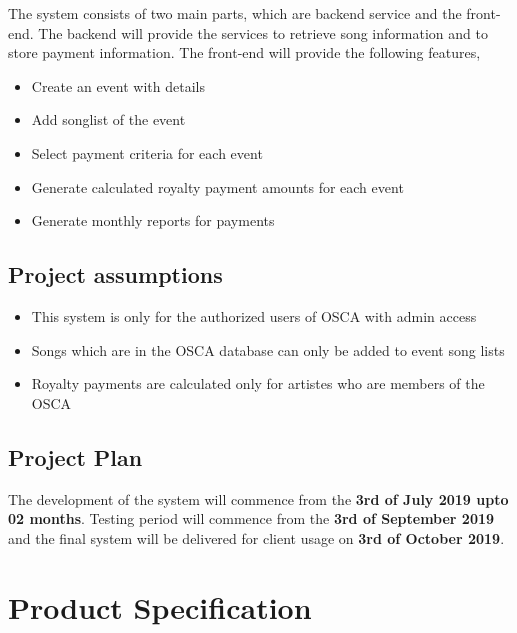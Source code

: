 \documentclass[12pt,a4paper]{article}
\begin{document}
The system consists of two main parts, which are backend service and the front-end. The backend will provide the services to retrieve song information and to store payment information.
The front-end will provide the following features,
\begin{itemize}
    \item Create an event with details
    \item Add songlist of the event
    \item Select payment criteria for each event
    \item Generate calculated royalty payment amounts for each event
    \item Generate monthly reports for payments
\end{itemize}
\vspace{12pt}


\subsection{Project assumptions}
\vspace{12pt}

\begin{itemize}
    \item This system is only for the authorized users of OSCA with admin access
    \item Songs which are in the OSCA database can only be added to event song lists
    \item Royalty payments are calculated only for artistes who are members of the OSCA
\end{itemize}
\vspace{12pt}

\subsection{Project Plan}
\vspace{12pt}

The development of the system will commence from the \textbf{3rd of July 2019 upto 02 months}.
Testing period will commence from the \textbf{3rd of September 2019} and the final system will be delivered for client usage on \textbf{3rd of October 2019}.
\vspace{12pt}

\clearpage
\section{Product Specification}
\vspace{12pt}
\end{document}

